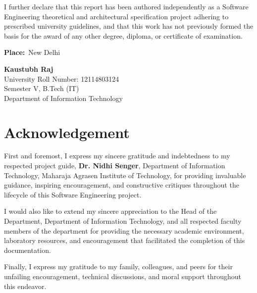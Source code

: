 \documentclass[12pt,a4paper,oneside]{report}
\begin{document}
I further declare that this report has been authored independently as a Software Engineering theoretical and architectural specification project adhering to prescribed university guidelines, and that this work has not previously formed the basis for the award of any other degree, diploma, or certificate of examination.

\vspace{2.5cm}

\noindent
\begin{minipage}{0.45\textwidth}
    
    \textbf{Place:}\ New Delhi
\end{minipage}
\hfill
\begin{minipage}{0.45\textwidth}
    \begin{flushright}
        \textbf{Kaustubh Raj}\\
        University Roll Number: 12114803124\\
        Semester V, B.Tech (IT)\\
        Department of Information Technology
    \end{flushright}
\end{minipage}

\newpage
\chapter*{Acknowledgement}
\thispagestyle{empty}

First and foremost, I express my sincere gratitude and indebtedness to my respected project guide, \textbf{Dr. Nidhi Senger}, Department of Information Technology, Maharaja Agrasen Institute of Technology, for providing invaluable guidance, inspiring encouragement, and constructive critiques throughout the lifecycle of this Software Engineering project.

I would also like to extend my sincere appreciation to the Head of the Department, Department of Information Technology, and all respected faculty members of the department for providing the necessary academic environment, laboratory resources, and encouragement that facilitated the completion of this documentation.

Finally, I express my gratitude to my family, colleagues, and peers for their unfailing encouragement, technical discussions, and moral support throughout this endeavor.
\end{document}
